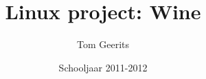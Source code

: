 \documentclass[12pt]{article}
\begin{document}
\title{Linux project: Wine}
\author{Tom Geerits}
\date{Schooljaar 2011-2012}
\maketitle
\newpagegi
\newpage
\tableofcontents
\newpage
\end{document}
